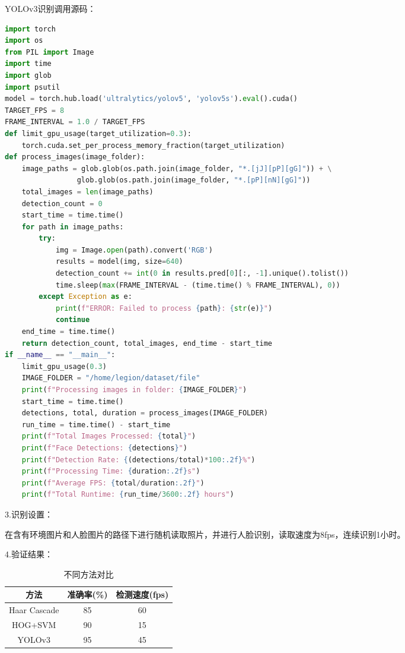 \documentclass[UTF8]{ctexart}
\begin{document}
YOLOv3识别调用源码：
\begin{lstlisting}[language=Python,caption=YOLOv3识别调用源码]
import torch
import os
from PIL import Image
import time
import glob
import psutil
model = torch.hub.load('ultralytics/yolov5', 'yolov5s').eval().cuda()
TARGET_FPS = 8
FRAME_INTERVAL = 1.0 / TARGET_FPS
def limit_gpu_usage(target_utilization=0.3):
    torch.cuda.set_per_process_memory_fraction(target_utilization)
def process_images(image_folder):
    image_paths = glob.glob(os.path.join(image_folder, "*.[jJ][pP][gG]")) + \
                 glob.glob(os.path.join(image_folder, "*.[pP][nN][gG]"))
    total_images = len(image_paths)
    detection_count = 0
    start_time = time.time()
    for path in image_paths:
        try:
            img = Image.open(path).convert('RGB')
            results = model(img, size=640)
            detection_count += int(0 in results.pred[0][:, -1].unique().tolist())
            time.sleep(max(FRAME_INTERVAL - (time.time() % FRAME_INTERVAL), 0))
        except Exception as e:
            print(f"ERROR: Failed to process {path}: {str(e)}")
            continue
    end_time = time.time()
    return detection_count, total_images, end_time - start_time
if __name__ == "__main__":
    limit_gpu_usage(0.3)
    IMAGE_FOLDER = "/home/legion/dataset/file"
    print(f"Processing images in folder: {IMAGE_FOLDER}")
    start_time = time.time()
    detections, total, duration = process_images(IMAGE_FOLDER)
    run_time = time.time() - start_time
    print(f"Total Images Processed: {total}")
    print(f"Face Detections: {detections}")
    print(f"Detection Rate: {(detections/total)*100:.2f}%")
    print(f"Processing Time: {duration:.2f}s")
    print(f"Average FPS: {total/duration:.2f}")
    print(f"Total Runtime: {run_time/3600:.2f} hours")
\end{lstlisting}

3.识别设置：

在含有环境图片和人脸图片的路径下进行随机读取照片，并进行人脸识别，读取速度为8fps，连续识别1小时。

4.验证结果：
\begin{table}[htbp]
\centering
\caption{不同方法对比}
\begin{tabular}{|c|c|c|}
\hline
方法 & 准确率(\%) & 检测速度(fps) \\
\hline
Haar Cascade & 85 & 60 \\
HOG+SVM & 90 & 15 \\
YOLOv3 & 95 & 45 \\
\hline
\end{tabular}
\end{table}
\end{document}
